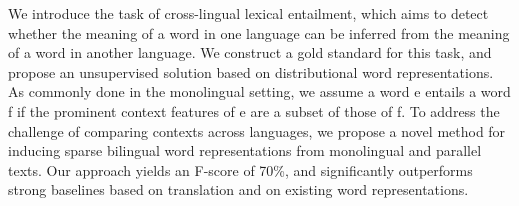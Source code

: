 We introduce the task of cross-lingual lexical entailment, which aims to detect whether the meaning of a word in one language can be inferred from the meaning of a word in another language. We construct a gold standard for this task, and propose an unsupervised solution based on distributional word representations. As commonly done in the monolingual setting, we assume a word e entails a word f if the prominent context features of e are a subset of those of f. To address the challenge of comparing contexts across languages, we propose a novel method for inducing sparse bilingual word representations from monolingual and parallel texts. Our approach yields an F-score of 70\%, and significantly outperforms strong baselines based on translation and on existing word representations.
